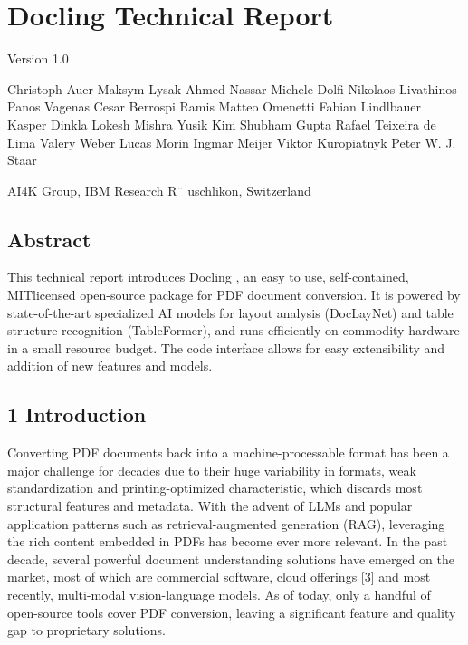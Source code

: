 \section*{Docling Technical Report}

\begin{figure}[h]
\end{figure}

Version 1.0

Christoph Auer Maksym Lysak Ahmed Nassar Michele Dolfi Nikolaos Livathinos Panos Vagenas Cesar Berrospi Ramis Matteo Omenetti Fabian Lindlbauer Kasper Dinkla Lokesh Mishra Yusik Kim Shubham Gupta Rafael Teixeira de Lima Valery Weber Lucas Morin Ingmar Meijer Viktor Kuropiatnyk Peter W. J. Staar

AI4K Group, IBM Research R¨ uschlikon, Switzerland

\subsection{Abstract}

This technical report introduces Docling , an easy to use, self-contained, MITlicensed open-source package for PDF document conversion. It is powered by state-of-the-art specialized AI models for layout analysis (DocLayNet) and table structure recognition (TableFormer), and runs efficiently on commodity hardware in a small resource budget. The code interface allows for easy extensibility and addition of new features and models.

\subsection{1 Introduction}

Converting PDF documents back into a machine-processable format has been a major challenge for decades due to their huge variability in formats, weak standardization and printing-optimized characteristic, which discards most structural features and metadata. With the advent of LLMs and popular application patterns such as retrieval-augmented generation (RAG), leveraging the rich content embedded in PDFs has become ever more relevant. In the past decade, several powerful document understanding solutions have emerged on the market, most of which are commercial software, cloud offerings [3] and most recently, multi-modal vision-language models. As of today, only a handful of open-source tools cover PDF conversion, leaving a significant feature and quality gap to proprietary solutions.

